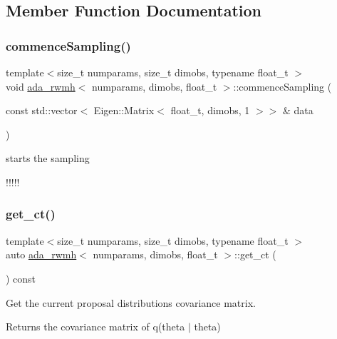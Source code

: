 \subsection{Member Function Documentation}
\mbox{\label{classada__rwmh_a5f7905f68c0b07541fa1729304f8988f}} 
\subsubsection{\texorpdfstring{commence\+Sampling()}{commenceSampling()}}
{\footnotesize\ttfamily template$<$size\+\_\+t numparams, size\+\_\+t dimobs, typename float\+\_\+t $>$ \\
void \hyperlink{classada__rwmh}{ada\+\_\+rwmh}$<$ numparams, dimobs, float\+\_\+t $>$\+::commence\+Sampling (\begin{DoxyParamCaption}\item[{const std\+::vector$<$ Eigen\+::\+Matrix$<$ float\+\_\+t, dimobs, 1 $>$$>$ \&}]{data }\end{DoxyParamCaption})}



starts the sampling 

!!!!! \mbox{\label{classada__rwmh_a72d5898fe897cba162456f269f385ade}} 
\subsubsection{\texorpdfstring{get\+\_\+ct()}{get\_ct()}}
{\footnotesize\ttfamily template$<$size\+\_\+t numparams, size\+\_\+t dimobs, typename float\+\_\+t $>$ \\
auto \hyperlink{classada__rwmh}{ada\+\_\+rwmh}$<$ numparams, dimobs, float\+\_\+t $>$\+::get\+\_\+ct (\begin{DoxyParamCaption}{ }\end{DoxyParamCaption}) const}



Get the current proposal distribution\textquotesingle{}s covariance matrix. 

\begin{DoxyReturn}{Returns}
the covariance matrix of q(theta\textquotesingle{} $\vert$ theta) 
\end{DoxyReturn}
\mbox{\label{classada__rwmh_a403b60eaee01171bf05a7c73b53ac28f}} 
